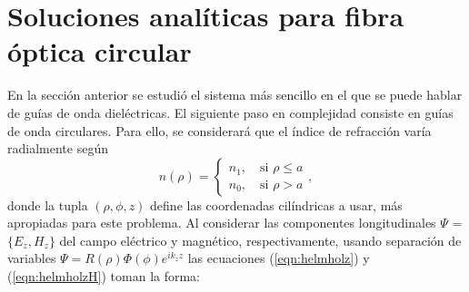 \section{Soluciones analíticas para fibra óptica circular}
En la sección anterior se estudió el sistema más sencillo en el que se puede hablar de guías de onda dieléctricas. El siguiente paso en complejidad consiste en guías de onda circulares. Para ello, se considerará que el índice de refracción varía radialmente según 
\begin{equation}
	n( \rho ) = 
	\left\{\begin{matrix}
	n_1, \quad \text{si } \rho \le a
	\\
	n_0, \quad \text{si } \rho > a
	\end{matrix}\right.
	,\nonumber
\end{equation}
donde la tupla $(\rho, \phi, z)$ define las coordenadas cilíndricas a usar, más apropiadas para este problema. Al considerar las componentes longitudinales $\Psi$ = $\{E_z, H_z\}$ del campo eléctrico y magnético, respectivamente, usando separación de variables $\Psi =  R(\rho)\Phi(\phi) e^{ik_z z} $ las ecuaciones (\ref{eqn:helmholz}) y (\ref{eqn:helmholzH}) toman la forma:

